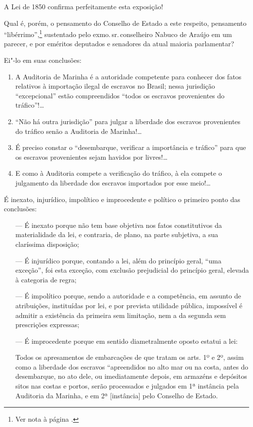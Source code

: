 A Lei de 1850 confirma perfeitamente esta exposição!

\asterisc

Qual é, porém, o pensamento do Conselho de Estado a este respeito,
pensamento ``libérrimo'',\footnote{Ver nota à página \pageref{liberrimo}.} sustentado pelo exmo.\,sr.\,conselheiro Nabuco de Araújo em um parecer, e por eméritos deputados e
senadores da atual maioria parlamentar?

Ei"-lo em suas conclusões:

\begin{enumerate}[label=\arabic*º]
\item A Auditoria de Marinha é a autoridade competente para conhecer dos
fatos relativos à importação ilegal de escravos no Brasil; nessa
jurisdição ``excepcional'' estão compreendidos ``todos os escravos
provenientes do tráfico''!\ldots{}

\item ``Não há outra jurisdição'' para julgar a liberdade dos escravos
provenientes do tráfico senão a Auditoria de Marinha!\ldots{}

\item É preciso constar o ``desembarque, verificar a importância e tráfico''
para que os escravos provenientes sejam havidos por livres!\ldots{}

\item E como à Auditoria compete a verificação do tráfico, à ela compete o
julgamento da liberdade dos escravos importados por esse meio!\ldots{}
\end{enumerate}

É inexato, injurídico, impolítico e improcedente e político o primeiro
ponto das conclusões:

\begin{itemize}
\item[---] É inexato porque não tem base objetiva nos fatos constitutivos da
materialidade da lei, e contraria, de plano, na parte subjetiva, a sua
claríssima disposição;

\item[---] É injurídico porque, contando a lei, além do princípio geral, ``uma
exceção'', foi esta exceção, com exclusão prejudicial do princípio geral,
elevada à categoria de regra;

\item[---] É impolítico porque, sendo a autoridade e a competência, em assunto
de atribuições, instituídas por lei, e por prevista utilidade pública,
impossível é admitir a existência da primeira sem limitação, nem a da
segunda sem prescrições expressas;

\item[---] É improcedente porque em sentido diametralmente oposto estatui a
lei:

Todos os apresamentos de embarcações de que tratam os arts. 1º e 2º,
assim como a liberdade dos escravos ``apreendidos no alto mar ou na
costa, antes do desembarque, no ato dele, ou imediatamente depois, em
armazéns e depósitos sitos nas costas e portos, serão processados e
julgados em 1ª instância pela Auditoria da Marinha, e em 2ª
{[}instância{]} pelo Conselho de Estado.
\end{itemize}

